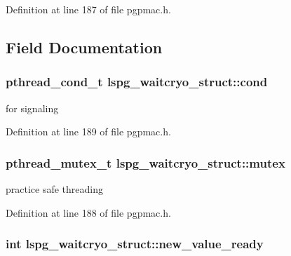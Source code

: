 Definition at line 187 of file pgpmac.\-h.



\subsection{Field Documentation}
\hypertarget{structlspg__waitcryo__struct_a54c275159d9f096e0d1884e64d099298}{
\subsubsection[{cond}]{\setlength{\rightskip}{0pt plus 5cm}pthread\-\_\-cond\-\_\-t lspg\-\_\-waitcryo\-\_\-struct\-::cond}}\label{structlspg__waitcryo__struct_a54c275159d9f096e0d1884e64d099298}


for signaling 



Definition at line 189 of file pgpmac.\-h.

\hypertarget{structlspg__waitcryo__struct_a62b50ead380fc8a6be35956eba384ba6}{
\subsubsection[{mutex}]{\setlength{\rightskip}{0pt plus 5cm}pthread\-\_\-mutex\-\_\-t lspg\-\_\-waitcryo\-\_\-struct\-::mutex}}\label{structlspg__waitcryo__struct_a62b50ead380fc8a6be35956eba384ba6}


practice safe threading 



Definition at line 188 of file pgpmac.\-h.

\hypertarget{structlspg__waitcryo__struct_a97298b773fd8c1f2ef20159093a08246}{
\subsubsection[{new\-\_\-value\-\_\-ready}]{\setlength{\rightskip}{0pt plus 5cm}int lspg\-\_\-waitcryo\-\_\-struct\-::new\-\_\-value\-\_\-ready}}\label{structlspg__waitcryo__struct_a97298b773fd8c1f2ef20159093a08246}


